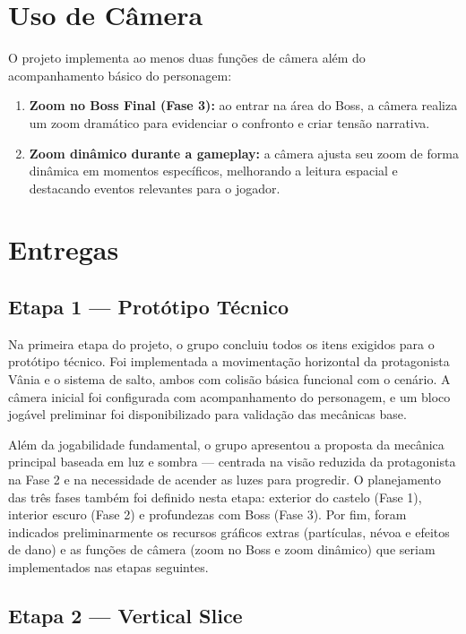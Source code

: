\documentclass[10pt,conference]{IEEEtran}
\begin{document}
\section{Uso de Câmera}

O projeto implementa ao menos duas funções de câmera além do acompanhamento básico do personagem:

\begin{enumerate}
    \item \textbf{Zoom no Boss Final (Fase 3):} ao entrar na área do Boss, a câmera realiza um zoom dramático para evidenciar o confronto e criar tensão narrativa.
    \item \textbf{Zoom dinâmico durante a gameplay:} a câmera ajusta seu zoom de forma dinâmica em momentos específicos, melhorando a leitura espacial e destacando eventos relevantes para o jogador.
\end{enumerate}

\section{Entregas}
\subsection{ Etapa 1 — Protótipo Técnico}
Na primeira etapa do projeto, o grupo concluiu todos os itens exigidos para o protótipo técnico. Foi implementada a movimentação horizontal da protagonista Vânia e o sistema de salto, ambos com colisão básica funcional com o cenário. A câmera inicial foi configurada com acompanhamento do personagem, e um bloco jogável preliminar foi disponibilizado para validação das mecânicas base.

Além da jogabilidade fundamental, o grupo apresentou a proposta da mecânica principal baseada em luz e sombra — centrada na visão reduzida da protagonista na Fase 2 e na necessidade de acender as luzes para progredir. O planejamento das três fases também foi definido nesta etapa: exterior do castelo (Fase 1), interior escuro (Fase 2) e profundezas com Boss (Fase 3). Por fim, foram indicados preliminarmente os recursos gráficos extras (partículas, névoa e efeitos de dano) e as funções de câmera (zoom no Boss e zoom dinâmico) que seriam implementados nas etapas seguintes.

\subsection{ Etapa 2 — Vertical Slice}
\end{document}
